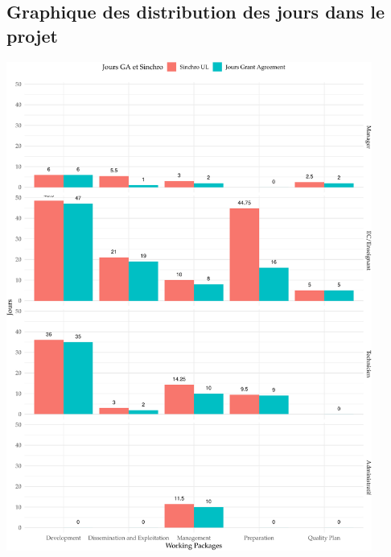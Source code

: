 \documentclass[
  a4paperpaper,
  onecolumn]{article}
\begin{document}
\hypertarget{graphique-des-distribution-des-jours-dans-le-projet}{%
\subsection{Graphique des distribution des jours dans le
projet}\label{graphique-des-distribution-des-jours-dans-le-projet}}

\includegraphics[width=0.9\textwidth,height=\textheight]{admin_files/figure-pdf/unnamed-chunk-8-1.pdf}
\end{document}
